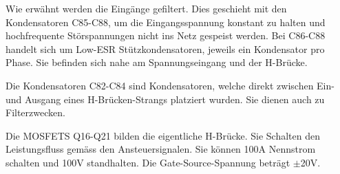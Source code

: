 Wie erwähnt werden die Eingänge gefiltert. Dies geschieht mit den Kondensatoren C85-C88, um die Eingangsspannung konstant zu halten und hochfrequente Störspannungen nicht ins Netz gespeist werden.
Bei C86-C88 handelt sich um Low-ESR Stützkondensatoren, jeweils ein Kondensator pro Phase.
Sie befinden sich nahe am Spannungseingang und der H-Brücke.

Die Kondensatoren C82-C84 sind Kondensatoren, welche direkt zwischen Ein- und Ausgang eines H-Brücken-Strangs platziert wurden.
Sie dienen auch zu Filterzwecken.

Die MOSFETS Q16-Q21 bilden die eigentliche H-Brücke. Sie Schalten den Leistungsfluss gemäss den Ansteuersignalen. Sie können 100A Nennstrom schalten und 100V standhalten. Die Gate-Source-Spannung beträgt $\pm$20V.

\newpage